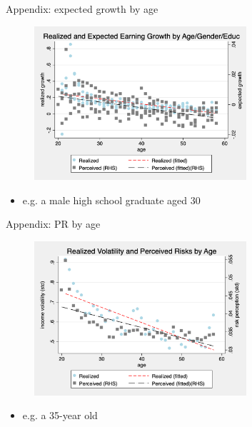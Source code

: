 \documentclass{beamer}
\begin{document}
\begin{frame}{Appendix: expected growth by age}
	\begin{figure}[ht]
		\label{appendix:age_gender_educ_level_compare_figure}
		\centering
		\includegraphics[width=0.7\textwidth]{figures/real_log_wage_shk_gr_level_by_age_edu_gender_compare.png}
	\end{figure}
	\begin{itemize}
		\item e.g. a male high school graduate aged 30 \quad  \hyperlink{age_compare}{} 
	\end{itemize}
\end{frame}

\begin{frame}{Appendix: PR by age}
	\begin{figure}[ht]
		\label{appendix:age_compare_figure}
		\centering
		\includegraphics[width=0.7\textwidth]{figures/real_log_wage_shk_gr_by_age_compare.png}
	\end{figure}
	\begin{itemize}
		\item e.g. a 35-year old   \quad  \hyperlink{age_compare}{} 
	\end{itemize}
\end{frame}
\end{document}
